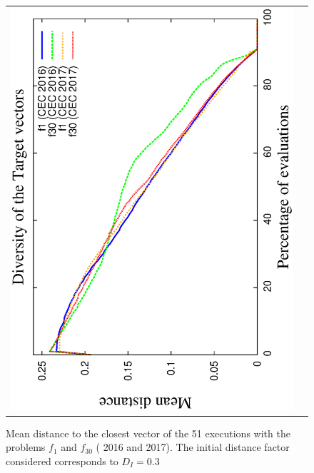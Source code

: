 \begin{figure}[t]
\begin{tabular}{cc}
   \includegraphics[scale=0.23, angle=-90]{Diversity_Target.eps} 
\end{tabular}
\caption{Mean distance to the closest vector of the 51 executions with the problems $f_1$ and $f_{30}$ (\CEC{} 2016 and \CEC{} 2017). The initial distance factor considered corresponds to $D_I=0.3$}
\label{fig:diversity}
\end{figure}



